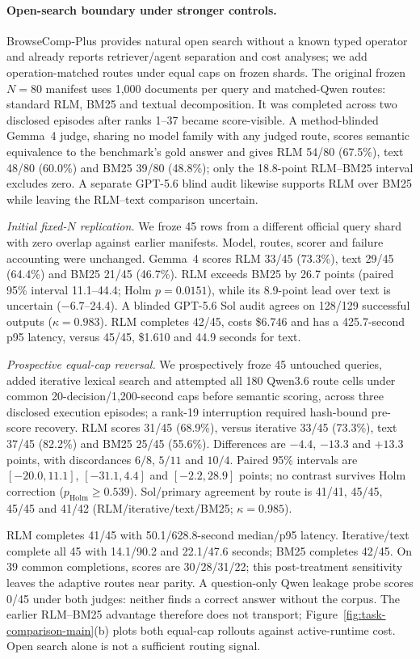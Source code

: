 \documentclass[letterpaper]{article}
\begin{document}
\paragraph{Open-search boundary under stronger controls.}
BrowseComp-Plus provides natural open search without a known typed operator and already reports retriever/agent separation and cost analyses; we add operation-matched routes under equal caps on frozen shards. The original frozen $N{=}80$ manifest uses 1,000 documents per query and matched-Qwen routes: standard RLM, BM25 and textual decomposition. It was completed across two disclosed episodes after ranks 1--37 became score-visible. A method-blinded Gemma~4 judge, sharing no model family with any judged route, scores semantic equivalence to the benchmark's gold answer and gives RLM 54/80 (67.5\%), text 48/80 (60.0\%) and BM25 39/80 (48.8\%); only the 18.8-point RLM--BM25 interval excludes zero. A separate GPT-5.6 blind audit likewise supports RLM over BM25 while leaving the RLM--text comparison uncertain.

\emph{Initial fixed-$N$ replication.} We froze 45 rows from a different official query shard with zero overlap against earlier manifests. Model, routes, scorer and failure accounting were unchanged. Gemma~4 scores RLM 33/45 (73.3\%), text 29/45 (64.4\%) and BM25 21/45 (46.7\%). RLM exceeds BM25 by 26.7 points (paired 95\% interval 11.1--44.4; Holm $p{=}0.0151$), while its 8.9-point lead over text is uncertain ($-6.7$--24.4). A blinded GPT-5.6 Sol audit agrees on 128/129 successful outputs ($\kappa{=}0.983$). RLM completes 42/45, costs \$6.746 and has a 425.7-second p95 latency, versus 45/45, \$1.610 and 44.9 seconds for text.

\emph{Prospective equal-cap reversal.} We prospectively froze 45 untouched queries, added iterative lexical search and attempted all 180 Qwen3.6 route cells under common 20-decision/1,200-second caps before semantic scoring, across three disclosed execution episodes; a rank-19 interruption required hash-bound pre-score recovery. RLM scores 31/45 (68.9\%), versus iterative 33/45 (73.3\%), text 37/45 (82.2\%) and BM25 25/45 (55.6\%). Differences are $-4.4$, $-13.3$ and $+13.3$ points, with discordances $6/8$, $5/11$ and $10/4$. Paired 95\% intervals are $[-20.0,11.1]$, $[-31.1,4.4]$ and $[-2.2,28.9]$ points; no contrast survives Holm correction ($p_{\mathrm{Holm}}\geq0.539$). Sol/primary agreement by route is 41/41, 45/45, 45/45 and 41/42 (RLM/iterative/text/BM25; $\kappa{=}0.985$).

RLM completes 41/45 with 50.1/628.8-second median/p95 latency. Iterative/text complete all 45 with 14.1/90.2 and 22.1/47.6 seconds; BM25 completes 42/45. On 39 common completions, scores are 30/28/31/22; this post-treatment sensitivity leaves the adaptive routes near parity. A question-only Qwen leakage probe scores 0/45 under both judges: neither finds a correct answer without the corpus. The earlier RLM--BM25 advantage therefore does not transport; Figure~\ref{fig:task-comparison-main}(b) plots both equal-cap rollouts against active-runtime cost. Open search alone is not a sufficient routing signal.
\end{document}
